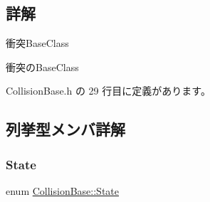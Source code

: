 \subsection{詳解}
衝突\+Base\+Class 

衝突の\+Base\+Class 

 Collision\+Base.\+h の 29 行目に定義があります。



\subsection{列挙型メンバ詳解}
\mbox{\label{class_collision_base_a4dd1ed00099a19c0176913af93c4e365}} 
\subsubsection{\texorpdfstring{State}{State}}
{\footnotesize\ttfamily enum \mbox{\hyperlink{class_collision_base_a4dd1ed00099a19c0176913af93c4e365}{Collision\+Base\+::\+State}}}

